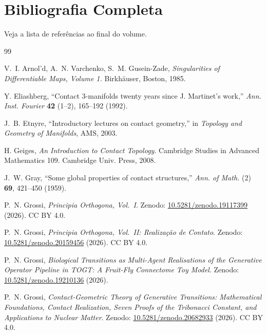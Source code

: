 \documentclass[12pt,a4paper,twoside]{book}
\theoremstyle{plain}
\theoremstyle{definition}
\theoremstyle{definition}
\begin{document}
\chapter{Bibliografia Completa}
\label{ap:bibliografia}

Veja a lista de referências ao final do volume.

\backmatter
\begin{thebibliography}{99}

 V.~I. Arnol'd, A.~N. Varchenko, S.~M. Gusein-Zade,
  \emph{Singularities of Differentiable Maps, Volume 1.}
  Birkh\"auser, Boston, 1985.

 Y. Eliashberg, ``Contact 3-manifolds twenty years since J. Martinet's work,''
  \emph{Ann. Inst. Fourier} \textbf{42} (1--2), 165--192 (1992).

 J.~B. Etnyre, ``Introductory lectures on contact geometry,''
  in \emph{Topology and Geometry of Manifolds}, AMS, 2003.

 H. Geiges, \emph{An Introduction to Contact Topology}.
  Cambridge Studies in Advanced Mathematics 109. Cambridge Univ. Press, 2008.

 J.~W. Gray, ``Some global properties of contact structures,''
  \emph{Ann. of Math.} (2) \textbf{69}, 421--450 (1959).


 P.~N. Grossi, \emph{Principia Orthogona, Vol.~I}.
  Zenodo: \href{https://doi.org/10.5281/zenodo.19117399}{10.5281/zenodo.19117399} (2026).
  CC BY 4.0.

 P.~N. Grossi, \emph{Principia Orthogona, Vol.~II: Realização de Contato}.
  Zenodo: \href{https://doi.org/10.5281/zenodo.20159456}{10.5281/zenodo.20159456} (2026).
  CC BY 4.0.

 P.~N. Grossi, \emph{Biological Transitions as Multi-Agent Realisations
  of the Generative Operator Pipeline in TOGT: A Fruit-Fly Connectome Toy Model}.
  Zenodo: \href{https://doi.org/10.5281/zenodo.19210136}{10.5281/zenodo.19210136} (2026).

 P.~N. Grossi, \emph{Contact-Geometric Theory of Generative Transitions:
  Mathematical Foundations, Contact Realization, Seven Proofs of the Tribonacci Constant,
  and Applications to Nuclear Matter}.
  Zenodo: \href{https://doi.org/10.5281/zenodo.20682933}{10.5281/zenodo.20682933} (2026).
  CC BY 4.0.


\end{thebibliography}
\end{document}
